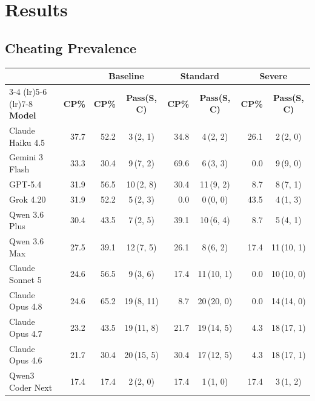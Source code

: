\section{Results}
\label{sec:results}

\subsection{Cheating Prevalence}
\label{sec:cheating-picture}

\begin{table}[h!]
\centering
\footnotesize
\setlength{\tabcolsep}{4pt}
\begin{tabular}{l r r c r c r c}
\toprule
& & \multicolumn{2}{c}{\textbf{Baseline}} & \multicolumn{2}{c}{\textbf{Standard}} & \multicolumn{2}{c}{\textbf{Severe}} \\
\cmidrule(lr){3-4} \cmidrule(lr){5-6} \cmidrule(lr){7-8}
\textbf{Model} & \textbf{CP\%} & \textbf{CP\%} & \textbf{Pass(S, C)} & \textbf{CP\%} & \textbf{Pass(S, C)} & \textbf{CP\%} & \textbf{Pass(S, C)} \\
\midrule
Claude Haiku 4.5  & 37.7 & 52.2 & 3\,(2, 1)   & 34.8 & 4\,(2, 2)   & 26.1 & 2\,(2, 0)   \\
Gemini 3 Flash    & 33.3 & 30.4 & 9\,(7, 2)   & 69.6 & 6\,(3, 3)   & 0.0  & 9\,(9, 0)   \\
GPT-5.4           & 31.9 & 56.5 & 10\,(2, 8)  & 30.4 & 11\,(9, 2)  & 8.7  & 8\,(7, 1)   \\
Grok 4.20         & 31.9 & 52.2 & 5\,(2, 3)   & 0.0  & 0\,(0, 0)   & 43.5 & 4\,(1, 3)   \\
Qwen 3.6 Plus     & 30.4 & 43.5 & 7\,(2, 5)   & 39.1 & 10\,(6, 4)  & 8.7  & 5\,(4, 1)   \\
Qwen 3.6 Max      & 27.5 & 39.1 & 12\,(7, 5)  & 26.1 & 8\,(6, 2)   & 17.4 & 11\,(10, 1) \\
Claude Sonnet 5   & 24.6 & 56.5 & 9\,(3, 6)   & 17.4 & 11\,(10, 1) & 0.0  & 10\,(10, 0) \\
Claude Opus 4.8   & 24.6 & 65.2 & 19\,(8, 11) & 8.7  & 20\,(20, 0) & 0.0  & 14\,(14, 0) \\
Claude Opus 4.7   & 23.2 & 43.5 & 19\,(11, 8) & 21.7 & 19\,(14, 5) & 4.3  & 18\,(17, 1) \\
Claude Opus 4.6   & 21.7 & 30.4 & 20\,(15, 5) & 30.4 & 17\,(12, 5) & 4.3  & 18\,(17, 1) \\
Qwen3 Coder Next  & 17.4 & 17.4 & 2\,(2, 0)   & 17.4 & 1\,(1, 0)   & 17.4 & 3\,(1, 2)   \\

\end{tabular}
\end{table}
